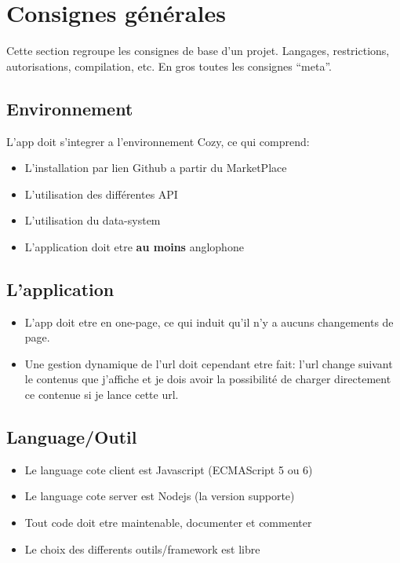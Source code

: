 \documentclass{42}
\begin{document}
\chapter{Consignes g\'en\'erales}

    Cette section regroupe les consignes de base d'un
    projet. Langages, restrictions, autorisations, compilation,
    etc. En gros toutes les consignes ``meta''.\newline

    \section{Environnement}
        L'app doit s'integrer a l'environnement Cozy, ce qui comprend:

        \begin{itemize}\itemsep1pt
            \item L'installation par lien Github a partir du MarketPlace
            \item L'utilisation des diff\'erentes API
            \item L'utilisation du data-system
            \item L'application doit etre \textbf{au moins} anglophone
        \end{itemize}

    \section{L'application}
        \begin{itemize}\itemsep1pt
            \item L'app doit etre en one-page, ce qui induit qu'il n'y a aucuns
        changements de page.

            \item Une gestion dynamique de l'url doit cependant etre
        fait: l'url change suivant le contenus que j'affiche et je dois avoir la
        possibilit\'e de charger directement ce contenue si je lance cette url.
        \end{itemize}

    \section{Language/Outil}
        \begin{itemize}\itemsep1pt
            \item Le language cote client est Javascript (ECMAScript 5 ou 6)
            \item Le language cote server est Nodejs (la version supporte)
            \item Tout code doit etre maintenable, documenter et commenter
            \item Le choix des differents outils/framework est libre
        \end{itemize}
\end{document}
